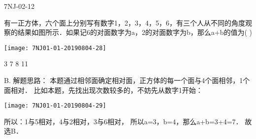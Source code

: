 \begin{defproblem}{7NJ-02-12}%
\begin{onlyproblem}%
有一正方体，六个面上分别写有数字1，2，3，4，5，6，有三个人从不同的角度观察的结果如图所示．如果记6的对面数字为a，2的对面数字为b，那么a+b的值为(    )
\begin{center}
\texttt{[image: 7NJ01-01-20190804-28]}
\end{center}

\xx
{3}
{7}
{8}
{11}

\end{onlyproblem}%
\begin{onlysolution}%
\begin{solution}%
B. 
解题思路： 本题通过相邻面确定相对面，正方体的每一个面与4个面相邻，1个面相对． 比如本题，先找出现次数较多的，不妨先从数字1开始：
\begin{center}
\texttt{[image: 7NJ01-01-20190804-29]}
\end{center}
 所以：1与5相对，4与2相对，3与6相对， 所以a=3，b=4，那么a+b=3+4=7． 故选B．  
\end{solution}%
\end{onlysolution}%
\end{defproblem}






